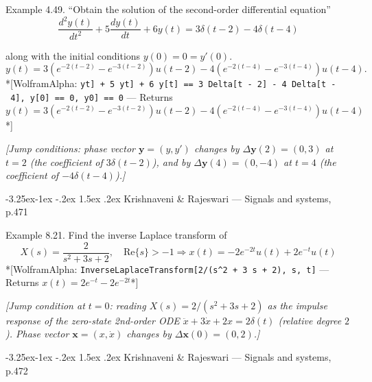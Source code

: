\documentclass[
  11pt,
]{article}
\makeatletter
\providecommand{\implies}{\Longrightarrow}
\renewcommand\paragraph{\@startsection{paragraph}{4}{\z@}%
                                     {-3.25ex\@plus -1ex \@minus -.2ex}%
                                     {1.5ex \@plus .2ex}%
                                     {\normalfont\normalsize\bfseries}}
\makeatother
\begin{document}
Example 4.49. ``Obtain the solution of the second-order differential
equation'' \[
\frac{d^2y(t)}{dt^2} + 5\frac{dy(t)}{dt} + 6y(t) = 3\delta(t-2) - 4\delta(t-4)
\]

along with the initial conditions \(y(0) = 0 = y'(0)\). \[
y(t) = 3(e^{-2(t-2)} - e^{-3(t-2)})u(t-2) - 4(e^{-2(t-4)} - e^{-3(t-4)})u(t-4).
\] *{[}WolframAlpha:
\texttt{y\textquotesingle{}\textquotesingle{}{[}t{]}\ +\ 5\ y\textquotesingle{}{[}t{]}\ +\ 6\ y{[}t{]}\ ==\ 3\ Delta{[}t\ -\ 2{]}\ -\ 4\ Delta{[}t\ -\ 4{]},\ y{[}0{]}\ ==\ 0,\ y\textquotesingle{}{[}0{]}\ ==\ 0}
--- Returns
\(y(t) = 3\left(e^{-2(t-2)} - e^{-3(t-2)}\right) u(t-2) - 4\left(e^{-2(t-4)} - e^{-3(t-4)}\right) u(t-4)\)*{]}

\emph{{[}Jump conditions: phase vector \(\mathbf y=(y,y')\) changes by
\(\Delta\mathbf y(2)=(0,3)\) at \(t=2\) (the coefficient of
\(3\delta(t-2)\)), and by \(\Delta\mathbf y(4)=(0,-4)\) at \(t=4\) (the
coefficient of \(-4\delta(t-4)\)).{]}}

\hypertarget{krishnaveni-rajeswari-signals-and-systems-p.471}{%
\paragraph{Krishnaveni \& Rajeswari --- Signals and systems,
p.471}\label{krishnaveni-rajeswari-signals-and-systems-p.471}}

Example 8.21. Find the inverse Laplace transform of \[
X(s) = \frac{2}{s^2 + 3s + 2}, \quad \text{Re}\{s\} > -1 \implies x(t) = -2e^{-2t}u(t) + 2e^{-t}u(t)
\] *{[}WolframAlpha:
\texttt{InverseLaplaceTransform{[}2/(s\^{}2\ +\ 3\ s\ +\ 2),\ s,\ t{]}}
--- Returns \(x(t) = 2e^{-t} - 2e^{-2t}\)*{]}

\emph{{[}Jump condition at \(t=0\): reading \(X(s)=2/(s^2+3s+2)\) as the
impulse response of the zero-state 2nd-order ODE
\(\ddot x+3\dot x+2x=2\delta(t)\) (relative degree \(2\)). Phase vector
\(\mathbf x=(x,\dot x)\) changes by \(\Delta\mathbf x(0)=(0,2)\).{]}}

\hypertarget{krishnaveni-rajeswari-signals-and-systems-p.472-1}{%
\paragraph{Krishnaveni \& Rajeswari --- Signals and systems,
p.472}\label{krishnaveni-rajeswari-signals-and-systems-p.472-1}}
\end{document}
